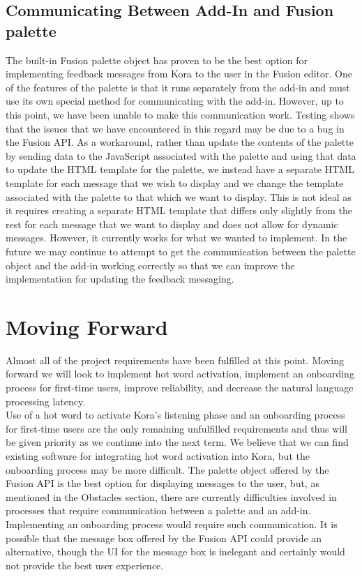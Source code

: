 \documentclass[onecolumn, draftclsnofoot,10pt, compsoc]{IEEEtran}
\begin{document}
	\subsection{Communicating Between Add-In and Fusion palette}
		The built-in Fusion palette object has proven to be the best option for implementing feedback messages from Kora to the user in the Fusion editor.
		One of the features of the palette is that it runs separately from the add-in and must use its own special method for communicating with the add-in.
		However, up to this point, we have been unable to make this communication work.
		Testing shows that the issues that we have encountered in this regard may be due to a bug in the Fusion API.
		As a workaround, rather than update the contents of the palette by sending data to the JavaScript associated with the palette and using that data to update the HTML template for the palette,
		we instead have a separate HTML template for each message that we wish to display and we change the template associated with the palette to that which we want to display.
		This is not ideal as it requires creating a separate HTML template that differs only slightly from the rest for each message that we want to display and does not allow for dynamic messages.
		However, it currently works for what we wanted to implement.
		In the future we may continue to attempt to get the communication between the palette object and the add-in working correctly so that we can improve the implementation for updating the feedback messaging.
 
\section{Moving Forward}
	Almost all of the project requirements have been fulfilled at this point.
	Moving forward we will look to implement hot word activation, implement an onboarding process for first-time users, improve reliability, and decrease the natural language processing latency. \\

	Use of a hot word to activate Kora's listening phase and an onboarding process for first-time users are the only remaining unfulfilled requirements and thus will be given priority as we continue into the next term.
	We believe that we can find existing software for integrating hot word activation into Kora, but the onboarding process may be more difficult.
	The palette object offered by the Fusion API is the best option for displaying messages to the user, but, as mentioned in the Obstacles section, there are currently difficulties involved in processes that require communication between a palette and an add-in.
	Implementing an onboarding process would require such communication.
	It is possible that the message box offered by the Fusion API could provide an alternative, though the UI for the message box is inelegant and certainly would not provide the best user experience. \\

\nocite{*}

\end{document}
